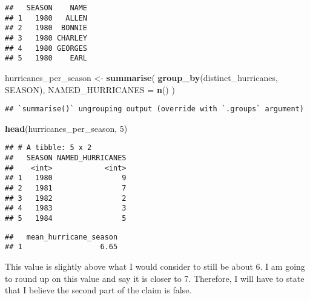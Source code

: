 \documentclass[
]{article}
\newenvironment{Shaded}{\begin{snugshade}}{\end{snugshade}}
\newcommand{\DataTypeTok}[1]{\textcolor[rgb]{0.13,0.29,0.53}{#1}}
\newcommand{\DecValTok}[1]{\textcolor[rgb]{0.00,0.00,0.81}{#1}}
\newcommand{\KeywordTok}[1]{\textcolor[rgb]{0.13,0.29,0.53}{\textbf{#1}}}
\newcommand{\NormalTok}[1]{#1}
\newcommand{\OperatorTok}[1]{\textcolor[rgb]{0.81,0.36,0.00}{\textbf{#1}}}
\newcommand{\OtherTok}[1]{\textcolor[rgb]{0.56,0.35,0.01}{#1}}
\newcommand{\StringTok}[1]{\textcolor[rgb]{0.31,0.60,0.02}{#1}}
\begin{document}
\begin{verbatim}
##   SEASON    NAME
## 1   1980   ALLEN
## 2   1980  BONNIE
## 3   1980 CHARLEY
## 4   1980 GEORGES
## 5   1980    EARL
\end{verbatim}

\begin{Shaded}
\begin{Highlighting}[]
\NormalTok{hurricanes_per_season <-}\StringTok{ }\KeywordTok{summarise}\NormalTok{(}
  \KeywordTok{group_by}\NormalTok{(distinct_hurricanes, SEASON),}
  \DataTypeTok{NAMED_HURRICANES =} \KeywordTok{n}\NormalTok{()}
\NormalTok{)}
\end{Highlighting}
\end{Shaded}

\begin{verbatim}
## `summarise()` ungrouping output (override with `.groups` argument)
\end{verbatim}

\begin{Shaded}
\begin{Highlighting}[]
\KeywordTok{head}\NormalTok{(hurricanes_per_season, }\DecValTok{5}\NormalTok{)}
\end{Highlighting}
\end{Shaded}

\begin{verbatim}
## # A tibble: 5 x 2
##   SEASON NAMED_HURRICANES
##    <int>            <int>
## 1   1980                9
## 2   1981                7
## 3   1982                2
## 4   1983                3
## 5   1984                5
\end{verbatim}

\begin{Shaded}
\end{Shaded}

\begin{verbatim}
##   mean_hurricane_season
## 1                  6.65
\end{verbatim}

This value is slightly above what I would consider to still be about 6.
I am going to round up on this value and say it is closer to 7.
Therefore, I will have to state that I believe the second part of the
claim is false.
\end{document}
